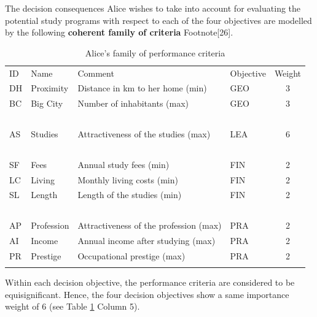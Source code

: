 The decision consequences Alice wishes to take into account for evaluating the potential study programs with respect to each of the four objectives are modelled by the following \textbf{coherent family of criteria} Footnote[26].

\begin{table}[h]
\caption{Alice's family of performance criteria}
\label{tab:12.2}       %
\begin{center}
    \begin{tabular}{l|l|l|l|c}
      \hline\noalign{\smallskip}
      ID & Name & Comment & Objective & Weight\\
      \noalign{\smallskip}\hline\noalign{\smallskip}
       DH  & Proximity  &  Distance in km to her home (min)      &   GEO    &     3\\
       BC  & Big City   &  Number of inhabitants (max)           &   GEO    &     3\\
       \   & \          &  \                                     &   \      &     \ \\
       AS  & Studies    &  Attractiveness of the studies (max)   &   LEA    &     6\\
       \   & \          &  \                                     &  \       &    \ \\
       SF  & Fees       &  Annual study fees (min)               &   FIN    &     2\\
       LC  & Living     &  Monthly living costs (min)            &   FIN    &     2\\
       SL  & Length     &  Length of the studies (min)           &   FIN    &     2\\
       \   &  \         &   \                                    &   \      &     \ \\
       AP  & Profession &  Attractiveness of the profession (max)&   PRA    &     2\\
       AI  & Income     &  Annual income after studying (max)    &   PRA    &     2\\
       PR  & Prestige   &  Occupational prestige (max)           &   PRA    &     2\\
      \noalign{\smallskip}\hline
    \end{tabular}
\end{center}
\end{table}

Within each decision objective, the performance criteria are considered to be equisignificant. Hence, the four decision objectives show a same importance weight of 6 (see Table \ref{tab:12.2} Column 5).

